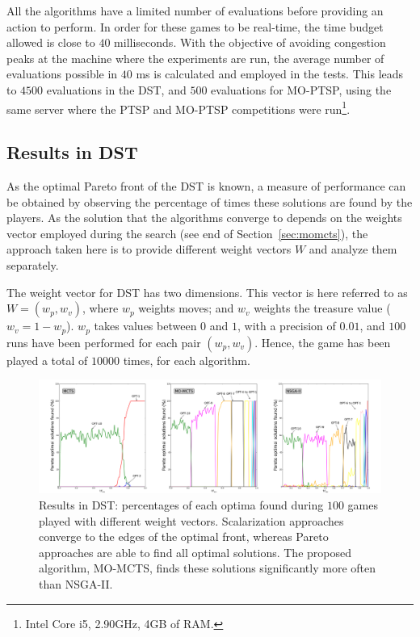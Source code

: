 \documentclass[journal]{IEEEtran}
\begin{document}
All the algorithms have a limited number of evaluations before providing an action to perform. In order for these games to be real-time, the time budget allowed is close to $40$ milliseconds. With the objective of avoiding congestion peaks at the machine where the experiments are run, the average number of evaluations possible in $40$ ms is calculated and employed in the tests. This leads to $4500$ evaluations in the DST, and $500$ evaluations for MO-PTSP, using the same server where the PTSP and MO-PTSP competitions were run\footnote{Intel Core i5, 2.90GHz, 4GB of RAM.}.


\subsection{Results in DST} \label{ssec:resDST}


As the optimal Pareto front of the DST is known, a measure of performance can be obtained by observing the percentage of times these solutions are found by the players. As the solution that the algorithms converge to depends on the weights vector employed during the search (see end of Section~\ref{sec:momcts}), the approach taken here is to provide different weight vectors $W$ and analyze them separately.  

The weight vector for DST has two dimensions. This vector is here referred to as $W = (w_p, w_v)$, where $w_p$ weights moves; and $w_v$ weights the treasure value ($w_v = 1 - w_p$). $w_p$ takes values between $0$ and $1$, with a precision of $0.01$, and $100$ runs have been performed for each pair $(w_p, w_v)$. Hence, the game has been played a total of $10000$ times, for each algorithm.

\begin{figure}[!t]
	\centering
	\includegraphics[width=2.1\columnwidth]{figures/perez9}
	\caption{Results in DST: percentages of each optima found during $100$ games played with different weight vectors. Scalarization approaches converge to the edges of the optimal front, whereas Pareto approaches are able to find all optimal solutions. The proposed algorithm, MO-MCTS, finds these solutions significantly more often than NSGA-II.}
	\label{fig:extCase}
\end{figure}
\end{document}
